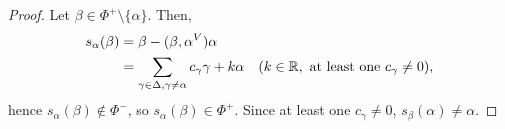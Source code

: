 \begin{proof}
Let $\beta \in \Phi^+ \setminus \{\alpha\}$. Then,
\begin{align*}
    s_\alpha(\beta) &= \beta - (\beta, \alpha^V) \alpha \\
    &= \sum_{\gamma \in \Delta, \gamma \neq \alpha}
        c_{\gamma} \gamma + k\alpha    \quad (k \in \mathbb{R}, \textrm{ at least one } c_\gamma \neq 0),
\end{align*}
hence $s_\alpha(\beta) \not\in \Phi^-$, so $s_\alpha(\beta) \in \Phi^+$. Since
at least one $c_\gamma \neq 0$, $s_\beta(\alpha) \neq \alpha$.
\end{proof}
